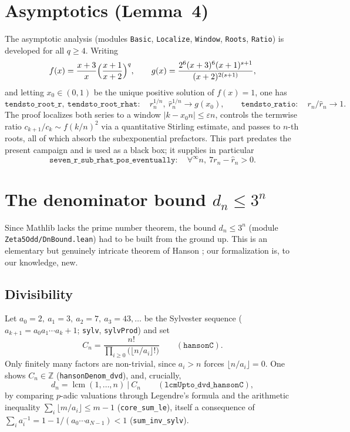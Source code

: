 \documentclass[11pt]{article}
\theoremstyle{definition}
\DeclareMathOperator{\lcm}{lcm}
\newcommand{\Z}{\mathbb{Z}}
\newcommand{\code}[1]{\texttt{#1}}
\begin{document}
\section{Asymptotics (Lemma~4)}\label{sec:asymp}

The asymptotic analysis (modules \code{Basic}, \code{Localize}, \code{Window},
\code{Roots}, \code{Ratio}) is developed for all $q\ge4$. Writing
\[
  f(x)=\frac{x+3}{x}\Bigl(\frac{x+1}{x+2}\Bigr)^{q},\qquad
  g(x)=\frac{2^6(x+3)^6(x+1)^{s+1}}{(x+2)^{2(s+1)}},
\]
and letting $x_0\in(0,1)$ be the unique positive solution of $f(x)=1$, one has
\[
  \code{tendsto\_root\_r},\ \code{tendsto\_root\_rhat}:\quad
  r_n^{1/n},\ \hat r_n^{1/n}\longrightarrow g(x_0),
  \qquad
  \code{tendsto\_ratio}:\quad r_n/\hat r_n\to1 .
\]
The proof localizes both series to a window $|k-x_0n|\le\varepsilon n$, controls
the termwise ratio $c_{k+1}/c_k\sim f(k/n)^2$ via a quantitative Stirling
estimate, and passes to $n$-th roots, all of which absorb the subexponential
prefactors. This part predates the present campaign and is used as a black box;
it supplies in particular
\[
  \code{seven\_r\_sub\_rhat\_pos\_eventually}:\quad
  \forall^{\infty}n,\ 7r_n-\hat r_n>0 .
\]

\section{The denominator bound $d_n\le 3^n$}\label{sec:hanson}

Since Mathlib lacks the prime number theorem, the bound $d_n\le3^n$
(module \code{Zeta5Odd/DnBound.lean}) had to be built from the ground up. This
is an elementary but genuinely intricate theorem of Hanson \cite{Hanson1972};
our formalization is, to our knowledge, new.

\subsection{Divisibility}

Let $a_0=2,\ a_1=3,\ a_2=7,\ a_3=43,\dots$ be the Sylvester sequence
($a_{k+1}=a_0a_1\cdots a_k+1$; \code{sylv}, \code{sylvProd}) and set
\[
  C_n=\frac{n!}{\prod_{i\ge0}\bigl(\lfloor n/a_i\rfloor!\bigr)}
  \qquad(\code{hansonC}).
\]
Only finitely many factors are non-trivial, since $a_i>n$ forces
$\lfloor n/a_i\rfloor=0$. One shows $C_n\in\Z$
(\code{hansonDenom\_dvd}), and, crucially,
\[
  d_n=\lcm(1,\dots,n)\ \big|\ C_n
  \qquad(\code{lcmUpto\_dvd\_hansonC}),
\]
by comparing $p$-adic valuations through Legendre's formula and the arithmetic
inequality $\sum_i\lfloor m/a_i\rfloor\le m-1$ (\code{core\_sum\_le}), itself a
consequence of $\sum_i a_i^{-1}=1-1/(a_0\cdots a_{N-1})<1$
(\code{sum\_inv\_sylv}).
\end{document}
